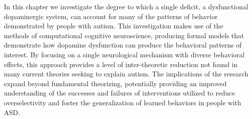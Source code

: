 
In this chapter we investigate the degree to which a single deficit, a dysfunctional dopaminergic system, can account for many of the patterns of behavior demonstrated by people with autism.  This investigation makes use of the methods of computational cognitive neuroscience, producing formal models that demonstrate how dopamine dysfunction can produce the behavioral patterns of interest.  By focusing on a single neurological mechanism with diverse behavioral effects, this approach provides a level of inter-theoretic reduction not found in many current theories seeking to explain autism.  The implications of the research expand beyond fundamental theorizing, potentially providing an improved understanding of the successes and failures of interventions utilized to reduce overselectivity and foster the generalization of learned behaviors in people with ASD.

